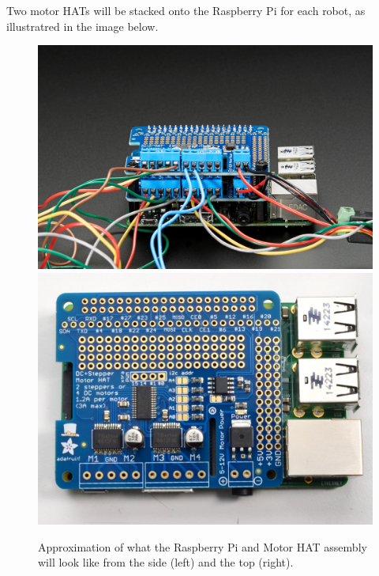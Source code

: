 Two motor HATs will be stacked onto the Raspberry Pi for each robot, as illustratred in the image below.

\begin{figure}
\centering
\includegraphics[width=0.45\columnwidth]{figs/HATs-on-pi.jpg}
\includegraphics[width=0.45\columnwidth]{figs/HAT-on-pi.jpg}
\caption{Approximation of what the Raspberry Pi and Motor HAT assembly will look like from the side (left) and the top (right).}
\label{fig:HATs}
\end{figure}
